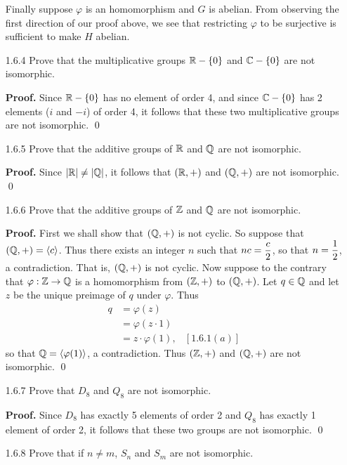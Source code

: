 \begin{enumerate}
      Finally suppose $\varphi$ is an homomorphism and $G$ is abelian. From 
      observing the first direction of our proof above, we see that restricting
      $\varphi$ to be surjective is sufficient to make $H$ abelian.
   \item[1.6.4]   Prove that the multiplicative groups $\mathbb{R} - \{0\}$ and
                  $\mathbb{C} - \{0\}$ are not isomorphic.

      \textbf{Proof.} Since $\mathbb{R} - \{0\}$ has no element of order 4, and since
      $\mathbb{C} - \{0\}$ has 2 elements ($i$ and $-i$) of order 4, it follows that
      these two multiplicative groups are not isomorphic. \qed
   \item[1.6.5]   Prove that the additive groups of $\mathbb{R}$ and $\mathbb{Q}$ are not
                  isomorphic.

      \textbf{Proof.} Since $|\mathbb{R}| \neq |\mathbb{Q}|$, it follows that $(\mathbb{R}, +)$ and
      $(\mathbb{Q}, +)$ are not isomorphic. \qed
   \item[1.6.6]   Prove that the additive groups of $\mathbb{Z}$ and $\mathbb{Q}$ are not
                  isomorphic.

      \textbf{Proof.} First we shall show that $(\mathbb{Q}, +)$ is not cyclic. So
      suppose that $(\mathbb{Q}, +) = \langle c \rangle$. Thus there exists an integer $n$ such 
      that $nc = \displaystyle\frac{c}{2}$, so that $\displaystyle n = \frac{1}{2}$, a contradiction. 
      That is, $(\mathbb{Q}, +)$ is not cyclic. Now suppose to the contrary that
      $\varphi : \mathbb{Z} \rightarrow \mathbb{Q}$ is a homomorphism from $(\mathbb{Z}, +)$ to
      $(\mathbb{Q}, +)$. Let $q \in \mathbb{Q}$ and let $z$ be the unique preimage of $q$ under
      $\varphi$. Thus
      \begin{align*}
         q &= \varphi(z) \\
           &= \varphi(z \cdot 1) \\
           &= z \cdot \varphi(1),  &[1.6.1(a)]
      \end{align*}
      so that $\mathbb{Q} = \langle \varphi(1) \rangle$, a contradiction. Thus $(\mathbb{Z}, +)$ and
      $(\mathbb{Q}, +)$ are not isomorphic. \qed
   \item[1.6.7]   Prove that $D_8$ and $Q_8$ are not isomorphic.

      \textbf{Proof.} Since $D_8$ has exactly 5 elements of order 2 and $Q_8$
      has exactly 1 element of order 2, it follows that these two groups are not
      isomorphic. \qed
   \item[1.6.8]   Prove that if $n \neq m$, $S_n$ and $S_m$ are not isomorphic.


\end{enumerate}
